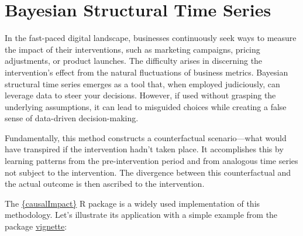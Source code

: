 \documentclass[
  letterpaper,
  DIV=11,
  numbers=noendperiod]{scrreprt}
\begin{document}
\chapter{Bayesian Structural Time
Series}\label{bayesian-structural-time-series}

In the fast-paced digital landscape, businesses continuously seek ways
to measure the impact of their interventions, such as marketing
campaigns, pricing adjustments, or product launches. The difficulty
arises in discerning the intervention's effect from the natural
fluctuations of business metrics. Bayesian structural time series
emerges as a tool that, when employed judiciously, can leverage data to
steer your decisions. However, if used without grasping the underlying
assumptions, it can lead to misguided choices while creating a false
sense of data-driven decision-making.

Fundamentally, this method constructs a counterfactual scenario---what
would have transpired if the intervention hadn't taken place. It
accomplishes this by learning patterns from the pre-intervention period
and from analogous time series not subject to the intervention. The
divergence between this counterfactual and the actual outcome is then
ascribed to the intervention.

The \href{https://github.com/google/CausalImpact}{\{causalImpact\}} R
package is a widely used implementation of this methodology. Let's
illustrate its application with a simple example from the package
\href{https://google.github.io/CausalImpact/CausalImpact.html}{vignette}:
\end{document}
